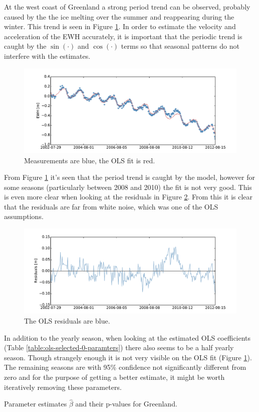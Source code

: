 At the west coast of Greenland a strong period trend can be observed, probably caused by the the ice melting over the summer and reappearing during the winter. This trend is seen in Figure \ref{fig:ols-selected-0-fit}. In order to estimate the velocity and acceleration of the EWH accurately, it is important that the periodic trend is caught by the $\sin(\cdot)$ and $\cos(\cdot)$ terms so that seasonal patterns do not interfere with the estimates.
\begin{figure}[H]
	\centering
	\includegraphics[width=\textwidth]{figures/ols-selected-0-fit}
	\caption{Measurements are blue, the OLS fit is red.}
	\label{fig:ols-selected-0-fit}
\end{figure}
 
From Figure \ref{fig:ols-selected-0-fit} it's seen that the period trend is caught by the model, however for some seasons (particularly between 2008 and 2010) the fit is not very good. This is even more clear when looking at the residuals in Figure \ref{fig:ols-selected-0-residual}. From this it is clear that the residuals are far from white noise, which was one of the OLS assumptions.
\begin{figure}[H]
	\centering
	\includegraphics[width=\textwidth]{figures/ols-selected-0-residual}
	\caption{The OLS residuals are blue.}
	\label{fig:ols-selected-0-residual}
\end{figure}

In addition to the yearly season, when looking at the estimated OLS coefficients (Table \ref{table:ols-selected-0-paramters}) there also seems to be a half yearly season. Though strangely enough it is not very visible on the OLS fit (Figure \ref{fig:ols-selected-0-fit}). The remaining seasons are with 95\% confidence not significantly different from zero and for the purpose of getting a better estimate, it might be worth iteratively removing these parameters.
\begin{table}[H]
\centering
\centerline{}
\caption{Parameter estimates $\hat{\beta}$ and their p-values for Greenland.}
\label{table:ols-selected-0-paramters}
\end{table}

